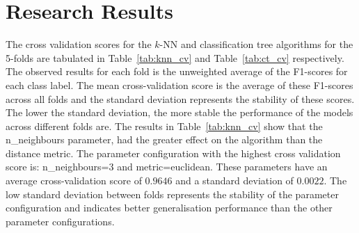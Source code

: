 \documentclass[conference]{IEEEtran}
\begin{document}
	\section{Research Results}\label{RR}
	The cross validation scores for the $k$-NN and classification tree algorithms for the 5-folds are tabulated in Table~\ref{tab:knn_cv} and Table~\ref{tab:ct_cv} respectively. The observed results for each fold is the unweighted average of the F1-scores for each class label. The mean cross-validation score is the average of these F1-scores across all folds and the standard deviation represents the stability of these scores. The lower the standard deviation, the more stable the performance of the models across different folds are. The results in Table~\ref{tab:knn_cv} show that the  n\_neighbours parameter, had the greater effect on the algorithm than the distance metric. The parameter configuration with the highest cross validation score is: n\_neighbours=3 and metric=euclidean. These parameters have an average cross-validation score of $0.9646$ and a standard deviation of $0.0022$. The low standard deviation between folds represents the stability of the parameter configuration and indicates better generalisation performance than the other parameter configurations.
	\begin{table}[hbtp]
		\caption{Cross-Validation Results for $k$-NN Hyper-parameter Tuning}
		\label{tab:knn_cv}
		\centering
	\end{table}
	
\end{document}
